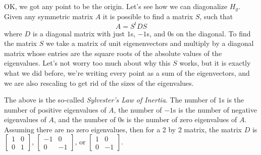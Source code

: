 \documentclass[12pt]{article}
\begin{document}
OK, we got any point to be the origin.  Let's see how we can diagonalize
$H_g$.  Given any symmetric matrix $A$ it is possible to find a matrix
$S$, such that
\[
A = S^t D S
\]
where $D$ is a diagonal matrix with just $1$s, $-1$s, and $0$s on the
diagonal.  To find the matrix $S$ we take a matrix of unit eigenenvectors 
and multiply by a diagonal matrix whose entries are the square roots
of the absolute values of the eigenvalues.  Let's not worry too much about
why this $S$ works, but it is exactly what we did before, we're writing
every point as a sum of the eigenvectors, and we are also rescaling to
get rid of the sizes of the eigenvalues.

The above is the so-called \emph{Sylvester's Law of Inertia}.
The number of $1$s is the number of positive eigenvalues of $A$,
the number of $-1$s is the number of negative eigenvalues of $A$,
and
the number of $0$s is the number of zero eigenvalues of $A$.
Assuming there are no zero eigenvalues,
then for a 2 by 2 matrix, the matrix $D$ is
$\left[ \begin{smallmatrix} 1 & 0 \\ 0 & 1 \end{smallmatrix} \right]$,
$\left[ \begin{smallmatrix} -1 & 0 \\ 0 & -1 \end{smallmatrix} \right]$,
or
$\left[ \begin{smallmatrix} 1 & 0 \\ 0 & -1 \end{smallmatrix} \right]$.
\end{document}

